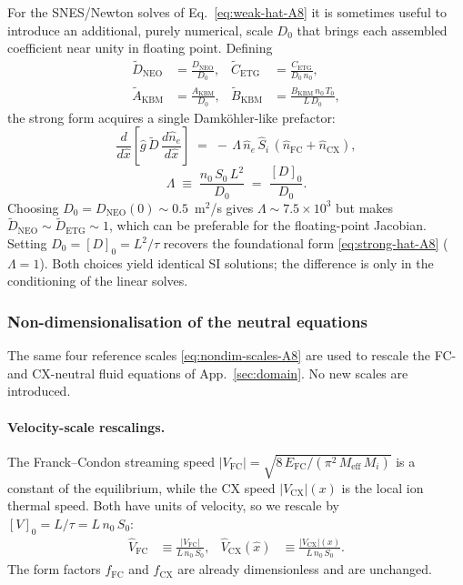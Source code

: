 \documentclass[twocolumn,secnumarabic,amssymb, nobibnotes, aps, prd]{revtex4-2}
\begin{document}
For the SNES/Newton solves of Eq.~\eqref{eq:weak-hat-A8} it is sometimes
useful to introduce an additional, purely numerical, scale $D_{0}$ that
brings each assembled coefficient near unity in floating point.
Defining
\begin{align}
  \tilde{D}_{\mathrm{NEO}} &= \frac{D_{\mathrm{NEO}}}{D_{0}}, &
  \tilde{C}_{\mathrm{ETG}} &= \frac{C_{\mathrm{ETG}}}{D_{0}\,n_{0}},
  \\
  \tilde{A}_{\mathrm{KBM}} &= \frac{A_{\mathrm{KBM}}}{D_{0}}, &
  \tilde{B}_{\mathrm{KBM}} &= \frac{B_{\mathrm{KBM}}\,n_{0}\,T_{0}}{L\,D_{0}},
\end{align}
the strong form acquires a single Damk\"ohler-like prefactor:
\begin{equation}
  \frac{d}{d\hat{x}}\!\left[\hat{g}\,\tilde{D}\,\frac{d\hat{n}_{e}}{d\hat{x}}\right]
  \;=\;-\,\Lambda\,\hat{n}_{e}\,\hat{S}_{i}\,(\hat{n}_{\mathrm{FC}}+\hat{n}_{\mathrm{CX}}),
\end{equation}
\begin{equation}
  \Lambda \;\equiv\; \frac{n_{0}\,S_{0}\,L^{2}}{D_{0}}
  \;=\; \frac{[D]_{0}}{D_{0}}.
\end{equation}
Choosing $D_{0}=D_{\mathrm{NEO}}(0)\sim 0.5$~m$^{2}$/s gives
$\Lambda \sim 7.5\!\times\!10^{3}$ but makes
$\tilde{D}_{\mathrm{NEO}}\sim\tilde{D}_{\mathrm{ETG}}\sim 1$, which can
be preferable for the floating-point Jacobian. Setting
$D_{0}=[D]_{0}=L^{2}/\tau$ recovers the foundational form
\eqref{eq:strong-hat-A8} ($\Lambda=1$). Both choices yield identical
SI solutions; the difference is only in the conditioning of the linear
solves.

\subsubsection{Non-dimensionalisation of the neutral equations}
\label{sec:nondim-neutrals}

The same four reference scales \eqref{eq:nondim-scales-A8} are used to
rescale the FC- and CX-neutral fluid equations of
App.~\ref{sec:domain}.  No new scales are introduced.

\paragraph{Velocity-scale rescalings.}
The Franck--Condon streaming speed
$|V_{\mathrm{FC}}| = \sqrt{8\,E_{\mathrm{FC}}/(\pi^{2}\,M_{\mathrm{eff}}\,M_{i})}$
is a constant of the equilibrium, while the CX speed
$|V_{\mathrm{CX}}|(x)$ is the local ion thermal speed.  Both have units
of velocity, so we rescale by $[V]_{0} = L/\tau = L\,n_{0}\,S_{0}$:
\begin{align}
  \hat V_{\mathrm{FC}} &\equiv \frac{|V_{\mathrm{FC}}|}{L\,n_{0}\,S_{0}}, &
  \hat V_{\mathrm{CX}}(\hat x) &\equiv \frac{|V_{\mathrm{CX}}|(x)}{L\,n_{0}\,S_{0}}.
  \label{eq:hat-V-A8}
\end{align}
The form factors $f_{\mathrm{FC}}$ and $f_{\mathrm{CX}}$ are already
dimensionless and are unchanged.
\end{document}
